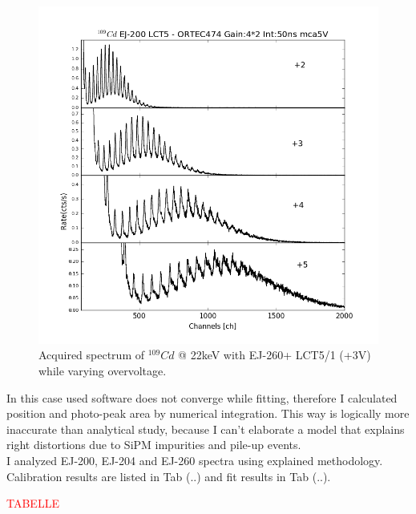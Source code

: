 \documentclass[10pt,a4paper, openany]{book}
\begin{document}
\begin{figure}[!h]
\begin{center}
\includegraphics[scale=0.5]{imm/conf.png}
\end{center}
\caption{Acquired spectrum of $^{109}Cd$ @ 22keV with EJ-260+ LCT5/1 (+3V) while varying overvoltage.} 
\label{fig:es_conf}
\end{figure}

In this case used software does not converge while fitting, therefore I calculated position and photo-peak area by numerical integration. This way is logically more inaccurate than analytical study, because I can't elaborate a model that explains right distortions due to SiPM impurities and pile-up events.\\[2ex]

I analyzed EJ-200, EJ-204 and EJ-260 spectra using explained methodology. Calibration results are listed in Tab (..) and fit results in Tab (..).\\[3ex]

\begin{huge}
\textcolor{red}{TABELLE}
\end{huge}
\end{document}
